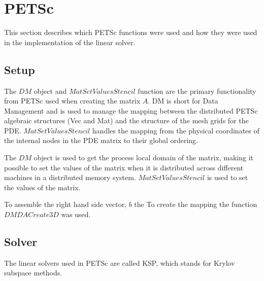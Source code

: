 \section{PETSc}

This section describes which PETSc functions were used and how they were used in 
the implementation of the linear solver\cite{petsc-user-ref}. 

\subsection{Setup}

The $DM$ object and $MatSetValuesStencil$ function are the primary functionality from 
PETSc used when creating the matrix $A$\cite{petsc-user-ref}. DM is short for 
Data Management and is used to manage the mapping between the distributed PETSc 
algebraic structures (Vec and Mat) and the structure of the mesh grids for the PDE. 
$MatSetValuesStencil$ handles the mapping from the physical coordinates of the 
internal nodes in the PDE matrix to their global ordering. 

The $DM$ object is used to get the process local domain of the matrix, 
making it possible to set the values of the matrix when it is distributed across 
different machines in a distributed memory system. $MatSetValuesStencil$ is used 
to set the values of the matrix.

To assemble the right hand side vector, $b$ the To create the mapping the function 
$DMDACreate3D$ was used.

\subsection{Solver}

The linear solvers used in PETSc are called KSP, which stands for Krylov subspace 
methods. 
